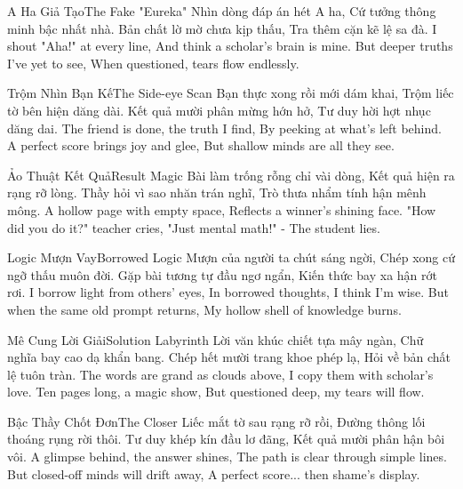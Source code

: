 \begin{tutuyetbox}{A Ha Giả Tạo}{The Fake "Eureka"}
Nhìn dòng đáp án hét A ha,
Cứ tưởng thông minh bậc nhất nhà.
Bản chất lờ mờ chưa kịp thấu,
Tra thêm cặn kẽ lệ sa đà.
\tcblower
I shout "Aha!" at every line,
And think a scholar's brain is mine.
But deeper truths I've yet to see,
When questioned, tears flow endlessly.
\end{tutuyetbox}

\begin{tutuyetbox}{Trộm Nhìn Bạn Kế}{The Side-eye Scan}
Bạn thực xong rồi mới dám khai,
Trộm liếc tờ bên hiện dăng dài.
Kết quả mười phân mừng hớn hở,
Tư duy hời hợt nhục dăng dai.
\tcblower
The friend is done, the truth I find,
By peeking at what's left behind.
A perfect score brings joy and glee,
But shallow minds are all they see.
\end{tutuyetbox}

\begin{tutuyetbox}{Ảo Thuật Kết Quả}{Result Magic}
Bài làm trống rỗng chỉ vài dòng,
Kết quả hiện ra rạng rỡ lòng.
Thầy hỏi vì sao nhăn trán nghĩ,
Trò thưa nhẩm tính hận mênh mông.
\tcblower
A hollow page with empty space,
Reflects a winner's shining face.
"How did you do it?" teacher cries,
"Just mental math!" - The student lies.
\end{tutuyetbox}

\begin{tutuyetbox}{Logic Mượn Vay}{Borrowed Logic}
Mượn của người ta chút sáng ngời,
Chép xong cứ ngỡ thấu muôn đời.
Gặp bài tương tự đầu ngơ ngẩn,
Kiến thức bay xa hận rớt rơi.
\tcblower
I borrow light from others' eyes,
In borrowed thoughts, I think I'm wise.
But when the same old prompt returns,
My hollow shell of knowledge burns.
\end{tutuyetbox}

\begin{tutuyetbox}{Mê Cung Lời Giải}{Solution Labyrinth}
Lời văn khúc chiết tựa mây ngàn,
Chữ nghĩa bay cao dạ khẩn bang.
Chép hết mười trang khoe phép lạ,
Hỏi về bản chất lệ tuôn tràn.
\tcblower
The words are grand as clouds above,
I copy them with scholar's love.
Ten pages long, a magic show,
But questioned deep, my tears will flow.
\end{tutuyetbox}

\begin{tutuyetbox}{Bậc Thầy Chốt Đơn}{The Closer}
Liếc mắt tờ sau rạng rỡ rồi,
Đường thông lối thoáng rụng rời thôi.
Tư duy khép kín đầu lơ đãng,
Kết quả mười phân hận bôi vôi.
\tcblower
A glimpse behind, the answer shines,
The path is clear through simple lines.
But closed-off minds will drift away,
A perfect score... then shame's display.
\end{tutuyetbox}

